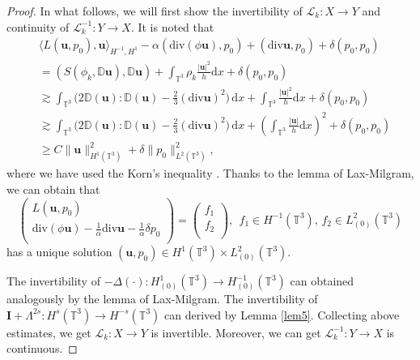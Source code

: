 \documentclass[reqno,a4paper,11pt]{amsart}
\theoremstyle{plain}
\numberwithin{equation}{section}
\begin{document}
\begin{proof}
	In what follows, we will first show the invertibility of  $\mathcal{L}_{k}:X\rightarrow Y$ and continuity of $\mathcal{L}_{k}^{-1}:Y\rightarrow X$. It is noted that
	\begin{align}\label{im8}
		&\nonumber\langle L(\mathbf{u},p_{0}),\mathbf{u}\rangle_{H^{-1},H^{1}}-\alpha(\mathrm{div}(\phi\mathbf{u}),p_{0})+(\mathrm{div}\mathbf{u},p_{0})+\delta( p_{0},p_{0})
		\\&\nonumber=(S(\phi_{k},\mathbb{ D}\mathbf{u}),\mathbb{ D}\mathbf{u})+\int_{\mathbb{T}^{3}}\rho_k\frac{|\mathbf{u}|^{2}}{h}\mathrm d x+\delta( p_{0},p_{0})
		\\&\nonumber\gtrsim  \int_{\mathbb{T}^{3}} \big( 2
		\mathbb{ D}(\mathbf{u}):\mathbb{ D}(\mathbf{u})-\frac{2}{3} (\mathrm{div} \mathbf{u})^2\big)\, \mathrm{d} x+\int_{\mathbb{T}^{3}}\frac{|\mathbf{u}|^{2}}{h}\mathrm d x+\delta( p_{0},p_{0})
		\\&\nonumber\gtrsim  \int_{\mathbb{T}^{3}} \big( 2
		\mathbb{ D}(\mathbf{u}):\mathbb{ D}(\mathbf{u})-\frac{2}{3} (\mathrm{div} \mathbf{u})^2\big)\, \mathrm{d} x+(\int_{\mathbb{T}^{3}}\frac{|\mathbf{u}|}{h}\mathrm d x)^{2}+\delta( p_{0},p_{0})
		\\&\nonumber\geq C\|\mathbf{u}\|_{H^{1}(\mathbb{T}^{3})}^{2}+\delta\| p_{0}\|_{L^{2}(\mathbb{T}^{3})}^{2},
	\end{align}
	where we have used the Korn's inequality \cite[Theorem 10.16]{FN}.
	Thanks to the lemma of Lax-Milgram, we can obtain that
	\begin{equation*}
		\left
		(\begin{array}{c}
			L(\mathbf{u},p_{0})\\
			\mathrm{div}(\phi\mathbf{u})-\frac{1}{\alpha}\mathrm{div}  \mathbf{u} -\frac{1}{\alpha}\delta p_{0}\\
		\end{array}
		\right)=\left
		(\begin{array}{c}
			f_{1}\\
			f_{2}\\
		\end{array}
		\right), \:\:\text{$f_{1}\in H^{-1}(\mathbb{T}^{3})$,  $f_{2}\in L_{(0)}^{2}(\mathbb{T}^{3})$}
	\end{equation*}
	has a unique solution $(\mathbf{u},p_{0})\in H^{1}(\mathbb{T}^{3})\times L_{(0)}^{2}(\mathbb{T}^{3})$.
	
	The invertibility of $-\Delta(\cdot):H_{(0)}^{1}(\mathbb{T}^{3})\rightarrow H_{(0)}^{-1}(\mathbb{T}^{3})$ can obtained analogously by the lemma of Lax-Milgram. The invertibility of $\mathbf{I}+\Lambda^{2s}:H^{s}(\mathbb{T}^{3})\rightarrow H^{-s}(\mathbb{T}^{3})$ can derived by Lemma \ref{lem5}. Collecting above estimates, we get $\mathcal{L}_{k}:X\rightarrow Y$ is invertible. Moreover, we can get $\mathcal{L}_{k}^{-1}:Y\rightarrow X$ is continuous.
	

\end{proof}
\end{document}
